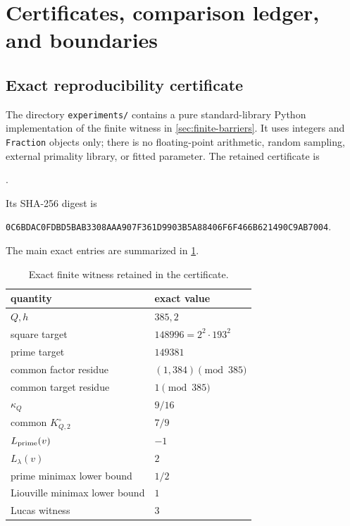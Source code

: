 \section{Certificates, comparison ledger, and boundaries}\label{sec:certificates-boundaries}

\subsection{Exact reproducibility certificate}

The directory \texttt{experiments/} contains a pure standard-library Python
implementation of the finite witness in \cref{sec:finite-barriers}.  It uses
integers and \texttt{Fraction} objects only; there is no floating-point
arithmetic, random sampling, external primality library, or fitted parameter.
The retained certificate is
\begin{center}
 .
\end{center}
Its SHA-256 digest is
\begin{center}
\small
\texttt{0C6BDAC0FDBD5BAB3308AAA907F361D9903B5A88406F6F466B621490C9AB7004}.
\end{center}
The main exact entries are summarized in \cref{tab:certificate-summary}.

\begin{table}[ht]
\centering
\caption{Exact finite witness retained in the certificate.}
\label{tab:certificate-summary}
\begin{tabular}{@{}ll@{}}
\toprule
quantity & exact value\\
\midrule
$Q,h$ & $385,2$\\
square target & $148996=2^2\cdot193^2$\\
prime target & $149381$\\
common factor residue & $(1,384)\pmod{385}$\\
common target residue & $1\pmod{385}$\\
$\kappa_Q$ & $9/16$\\
common $K_{Q,2}^{\circ}$ & $7/9$\\
$L_{\rm prime}(v)$ & $-1$\\
$L_\lambda(v)$ & $2$\\
prime minimax lower bound & $1/2$\\
Liouville minimax lower bound & $1$\\
Lucas witness & $3$\\
\bottomrule
\end{tabular}
\end{table}

